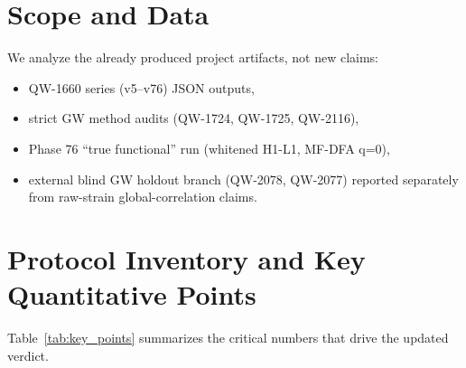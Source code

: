 \documentclass[11pt,a4paper]{article}
\begin{document}
\section{Scope and Data}
We analyze the already produced project artifacts, not new claims:
\begin{itemize}[leftmargin=1.5em]
    \item QW-1660 series (v5--v76) JSON outputs,
    \item strict GW method audits (QW-1724, QW-1725, QW-2116),
    \item Phase 76 ``true functional'' run (whitened H1-L1, MF-DFA q=0),
    \item external blind GW holdout branch (QW-2078, QW-2077) reported separately from raw-strain global-correlation claims.
\end{itemize}

\section{Protocol Inventory and Key Quantitative Points}
Table~\ref{tab:key_points} summarizes the critical numbers that drive the updated verdict.
\end{document}
